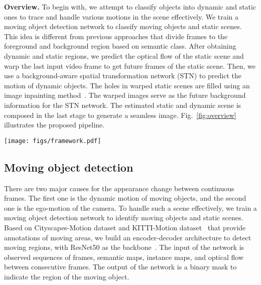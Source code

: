 \documentclass[10pt,twocolumn,letterpaper]{article}
\begin{document}
\vspace{2mm}
\noindent\textbf{Overview.}
To begin with, we attempt to classify objects into dynamic and static ones to trace and handle various motions in the scene effectively. 
We train a moving object detection network to classify moving objects and static scenes. 
This idea is different from previous approaches that divide frames to the foreground and background region based on semantic class.
After obtaining dynamic and static regions, we predict the optical flow of the static scene and warp the last input video frame to get future frames of the static scene. 
Then, we use a background-aware spatial transformation network (STN) to predict the motion of dynamic objects. The holes in warped static scenes are filled using an image inpainting method~\cite{yu2018generative}. The warped images serve as the future background information for the STN network. 
The estimated static and dynamic scene is composed in the last stage to generate a seamless image. Fig.~\ref{fig:overview} illustrates the proposed pipeline.





\begin{figure*}[t!]
\hspace{-4mm}
\centering
\texttt{[image: figs/framework.pdf]}
\vspace{1mm}
\caption{
Overview of the proposed architecture. We use a dynamic object detection model  to separate moving objects and static background. The missing foreground area in the generated future background is inpainted using the inpainting model . By providing the background images for the future, we apply a spatial transformer to predict moving objects. After that, we composite the foreground and background images and use a video inpainting module  to inpaint occluded area.
}
\label{fig:overview}
\end{figure*}






\subsection{Moving object detection}
There are two major causes for the appearance change between continuous frames. The first one is the dynamic motion of moving objects, and the second one is the ego-motion of the camera. To handle such a scene effectively, we train a moving object detection network to identify moving objects and static scenes. Based on Cityscapes-Motion dataset and KITTI-Motion dataset~\cite{Valada_2017_IROS} that provide annotations of moving areas, we build an encoder-decoder architecture to detect moving regions, with ResNet50 as the backbone~\cite{resnet}. The input of the network is observed sequences of frames, semantic maps, instance maps, and optical flow between consecutive frames. The output of the network is a binary mask to indicate the region of the moving object.
\end{document}
